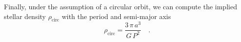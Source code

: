 \documentclass[floatfix,ApJL,twocolumn]{aastex631}
\begin{document}
Finally, under the assumption of a circular orbit, we can compute the implied stellar density $\rho_\mathrm{circ}$ with the period and semi-major axis
\begin{equation}
  \rho_\mathrm{circ} = \frac{3\,\pi\,a^3}{G\,P^2} \quad.
\end{equation}
\end{document}
